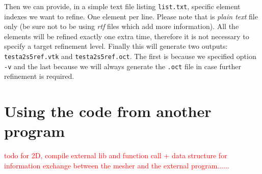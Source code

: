 \documentclass[10pt]{article}
\begin{document}
Then we can provide, in a simple text file listing \texttt{list.txt}, specific element indexes we want to refine. One element per line. Please note that is \textit{plain text} file only (be sure not to be using \textit{rtf} files which add more information).
All the elements will be refined exactly one extra time, therefore it is not necessary to specify a target refinement level. Finally this will generate two outputs: \texttt{testa2s5ref.vtk} and \texttt{testa2s5ref.oct}. The first is because we specified option \texttt{-v} and the last because we will always generate the \texttt{.oct} file in case further refinement is required. 
%
%

\section{Using the code from another program}
\label{inside}
%
\textcolor{red}{todo for 2D, compile external lib and function call + data structure for information exchange between the mesher and the external program......}
\end{document}
